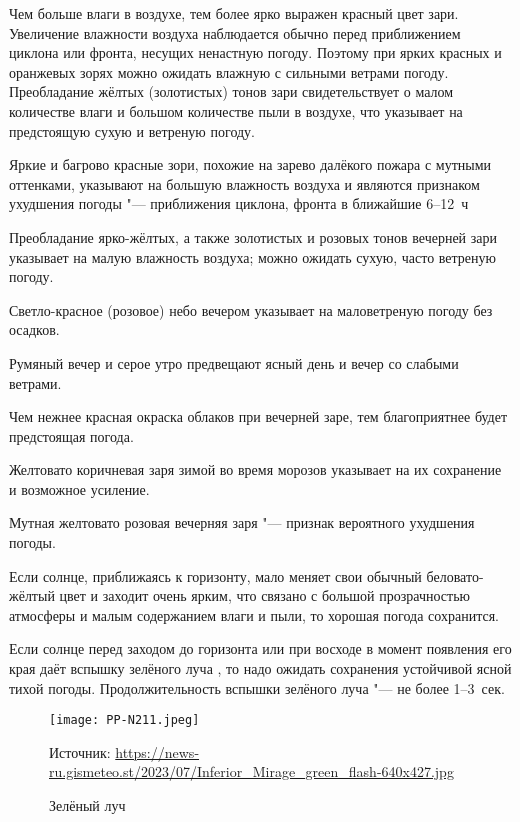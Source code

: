 Чем больше влаги в воздухе, тем более ярко выражен красный цвет
зари. Увеличение влажности воздуха наблюдается обычно перед
приближением циклона или фронта, несущих ненастную погоду. Поэтому при
ярких красных и оранжевых зорях можно ожидать влажную с сильными
ветрами погоду. Преобладание жёлтых (золотистых) тонов зари
свидетельствует о малом количестве влаги и большом количестве пыли в
воздухе, что указывает на предстоящую сухую и ветреную погоду.

 Яркие и багрово красные зори, похожие на зарево далёкого
пожара с мутными оттенками, указывают на большую влажность воздуха и
являются признаком ухудшения погоды "--- приближения циклона, фронта в
ближайшие 6--12~ч

 Преобладание ярко-жёлтых, а также золотистых и розовых тонов
вечерней зари указывает на малую влажность воздуха; можно ожидать
сухую, часто ветреную погоду.

 Светло-красное (розовое) небо вечером указывает на маловетреную
погоду без осадков.

 Румяный вечер и серое утро предвещают ясный день и вечер со
слабыми ветрами.

 Чем нежнее красная окраска облаков при вечерней заре, тем
благоприятнее будет предстоящая погода.

 Желтовато коричневая заря зимой во время морозов указывает на их
сохранение и возможное усиление.

 Мутная желтовато розовая вечерняя заря "--- признак вероятного
ухудшения погоды.

 Если солнце, приближаясь к горизонту, мало меняет свои обычный
беловато-жёлтый цвет и заходит очень ярким, что связано с большой
прозрачностью атмосферы и малым содержанием влаги и пыли, то хорошая
погода сохранится.

 Если солнце перед заходом до горизонта или при восходе в момент
появления его края даёт вспышку зелёного луча , то надо ожидать
сохранения устойчивой ясной тихой погоды. Продолжительность вспышки
зелёного луча "--- не более 1--3~сек.

\begin{figure}[htb]
  \centering{}
  \texttt{[image: PP-N211.jpeg]}
  \caption{Зелёный луч}
  \label{fig:pp-n211}
  \scriptsize
  \centering{}Источник: \url{https://news-ru.gismeteo.st/2023/07/Inferior_Mirage_green_flash-640x427.jpg}
\end{figure}

